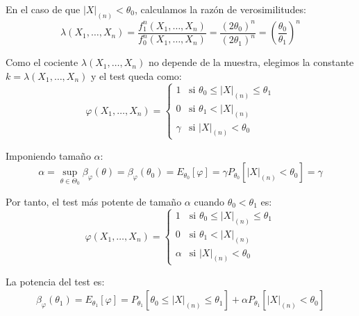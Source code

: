 \begin{ejercicio}
\begin{description}
        En el caso de que $|X|_{(n)} < \theta_0$, calculamos la razón de verosimilitudes:
        \begin{equation*}
            \lambda(X_1, \ldots, X_n) = \frac{f_1^n(X_1, \ldots, X_n)}{f_0^n(X_1, \ldots, X_n)} = \frac{(2\theta_0)^n}{(2\theta_1)^n} = \left(\frac{\theta_0}{\theta_1}\right)^n
        \end{equation*}

        Como el cociente $\lambda(X_1, \ldots, X_n)$ no depende de la muestra, elegimos la constante $k=\lambda(X_1, \ldots, X_n)$ y el test queda como:
        \begin{equation*}
            \varphi(X_1, \ldots, X_n) = \left\{\begin{array}{ll}
                1 & \text{si\ } \theta_0 \leq |X|_{(n)} \leq \theta_1 \\
                0 & \text{si\ } \theta_1 < |X|_{(n)} \\
                \gamma & \text{si\ } |X|_{(n)} < \theta_0
            \end{array}\right.
        \end{equation*}

        Imponiendo tamaño $\alpha$:
        \begin{equation*}
            \alpha = \sup_{\theta \in \Theta_0}\beta_\varphi(\theta) = \beta_\varphi(\theta_0) = E_{\theta_0}[\varphi] = \gamma P_{\theta_0}[|X|_{(n)} < \theta_0]
            = \gamma
        \end{equation*}
        
        Por tanto, el test más potente de tamaño $\alpha$ cuando $\theta_0 < \theta_1$ es:
        \begin{equation*}
            \varphi(X_1, \ldots, X_n) = \left\{\begin{array}{ll}
                1 & \text{si\ } \theta_0 \leq |X|_{(n)} \leq \theta_1 \\
                0 & \text{si\ } \theta_1 < |X|_{(n)} \\
                \alpha & \text{si\ } |X|_{(n)} < \theta_0
            \end{array}\right.
        \end{equation*}

        La potencia del test es:
        \begin{align*}
            \beta_\varphi(\theta_1) = E_{\theta_1}[\varphi] = P_{\theta_1}[\theta_0 \leq |X|_{(n)} \leq \theta_1] + \alpha P_{\theta_1}[|X|_{(n)} < \theta_0]
        \end{align*}


\end{description}
\end{ejercicio}
